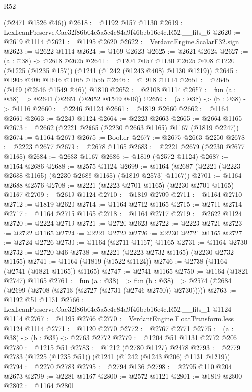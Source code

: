 \begin{lexlean}{R52}
\begin{coremodule}
      (@2471 @1526 @46))
@2618 := @1192 @157 @1130
@2619 := LexLeanPreserve.Cac32f86b04c5a5e4c84d9f46beb16e4c.R52.__fits_6
@2620 := @2619 @1114
@2621 := @1195 @2620
@2622 := VerdantEngine.ScalarF32.sign
@2623 := @2622 @1114
@2624 := @169 @2623
@2625 := @2621 @2624
@2627 := (a : @38) -> @2618 @2625
@2641 := @1204
    @157
    @1130
    @2625
    @408
    @1220
    (@1225 (@1235 @157))
    (@1241 (@1242 (@1243 @408) @1130 @1219))
@2645 := @1905 @406 @1516 @1165 @1555
@2646 := @1918 @1114
@2651 := @2645 (@169 (@2646 @1549 @46)) @1810
@2652 := @2108 @1114
@2657 := fun (a : @38) => @2641 (@2651 (@2652 @1549 @46))
@2659 := (a : @38) -> (b : @38) -> @1116
@2660 := @2246 @1124
@2661 := @1819 @2660
@2662 := @1164 @2661
@2663 := @2249 @1124
@2664 := @2223 @2663
@2665 := @2664 @1165
@2673 := @2662 (@2221 @2665 (@2230 @2663 @1165) @1167 (@1819 @2247))
@2674 := @1164 @2673
@2675 := Bool.or
@2677 := @2675 @2663 @2250
@2678 := @2223 @2677
@2679 := @2678 @1165
@2683 := @2221 @2679 (@2230 @2677 @1165)
@2684 := @2683 @1167
@2686 := @1819 (@2572 @1124)
@2687 := @1164 @2686
@2688 := @2575 @1124
@2699 := @1164 (@2687 (@2221 (@2223 @2688 @1165) (@2230 @2688 @1165) (@1819 @2573) @1167))
@2701 := @1164 @2688 @2576
@2708 := @2221 (@2223 @2701 @1165) (@2230 @2701 @1165) @1167
@2709 := @2619 @1124
@2710 := @1819 @2709
@2711 := @1164 @2710
@2712 := @1819 @2620
@2714 := @1164 @2712 @1165
@2715 := @2711 @2714
@2717 := @1164 @2715 @1165
@2718 := @1164 @2717
@2719 := @2622 @1124
@2720 := @2224 @2719
@2721 := @2720 @2623
@2722 := @2223 @2721
@2723 := @2722 @1165
@2724 := @2221 @2723
@2726 := @2230 @2721 @1165
@2727 := @2724 @2726
@2730 := @1164 (@2711 @1167) @1165
@2731 := @1164 @2730
@2732 := @2720 @46
@2738 := @2221 (@2223 @2732 @1165) (@2230 @2732 @1165)
@2741 := @1164 (@1819 (@1522 @1124))
@2746 := @2738 (@1164 (@2741 (@1821 @1165)) @1165)
@2747 := @2741 @1165
@2750 := @1164 (@1821 @2747) @1165
@2761 := fun (a : @38) =>
  fun (b : @38) => @2674 (@2684 (@2699 (@2708 (@2718 (@2727 (@2731 (@2746 @2750)) @2730)))))
@2763 := @1192 @51 @1131
@2766 := LexLeanPreserve.Cac32f86b04c5a5e4c84d9f46beb16e4c.R52.__fits_1 @1124 @1114
@2767 := @1195 @2766
@2770 := VerdantEngine.FloatTransform.less @1124 @1114
@2771 := @1120 @2770
@2772 := @2767 @2771
@2775 := (a : @38) -> (b : @38) -> @2763 @2772
@2779 := @1204 @51 @1131 @2772 @206
@2780 := @1215 @51
@2783 := @1212 (@2780 @1127) @2478
@2793 := @2779 @2783 (@1225 (@1235 @51)) (@1241 (@1242 (@1243 @206) @1131 @1219))
@2794 := @2270 @2783
@2795 := @2794 @136
@2798 := @2795 @110 @204 @2673
@2799 := @2281 @1167
@2800 := @2572 @1121
@2801 := @1819 @2800
@2802 := @1164 @2801

\end{coremodule}
\end{lexlean}
